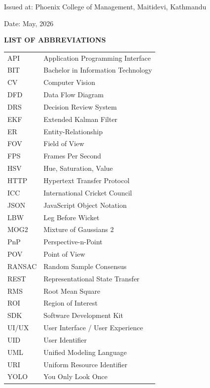 \documentclass[12pt,a4paper]{report}
\begin{document}
\vspace{3cm}

Issued at: Phoenix College of Management, Maitidevi, Kathmandu

Date: May, 2026

\clearpage
\hypersetup{pageanchor=true}

\tableofcontents

\listoffigures

\listoftables
\clearpage

\begin{center}\textbf{\fontsize{16}{19}\selectfont LIST OF ABBREVIATIONS}\end{center}
\vspace{0.5cm}

\begin{tabularx}{\textwidth}{lX}
API & Application Programming Interface \\
BIT & Bachelor in Information Technology \\
CV & Computer Vision \\
DFD & Data Flow Diagram \\
DRS & Decision Review System \\
EKF & Extended Kalman Filter \\
ER & Entity-Relationship \\
FOV & Field of View \\
FPS & Frames Per Second \\
HSV & Hue, Saturation, Value \\
HTTP & Hypertext Transfer Protocol \\
ICC & International Cricket Council \\
JSON & JavaScript Object Notation \\
LBW & Leg Before Wicket \\
MOG2 & Mixture of Gaussians 2 \\
PnP & Perspective-n-Point \\
POV & Point of View \\
RANSAC & Random Sample Consensus \\
REST & Representational State Transfer \\
RMS & Root Mean Square \\
ROI & Region of Interest \\
SDK & Software Development Kit \\
UI/UX & User Interface / User Experience \\
UID & User Identifier \\
UML & Unified Modeling Language \\
URI & Uniform Resource Identifier \\
YOLO & You Only Look Once \\
\end{tabularx}
\end{document}
